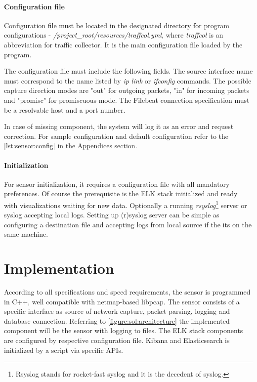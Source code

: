 \documentclass[12pt,a4paper,twoside]{report}
\begin{document}
			\subsubsection*{Configuration file} \label{implementation:sensor:config}
				Configuration file must be located in the designated directory for program configurations - \emph{/project\_root/resources/traffcol.yml}, where \emph{traffcol} is an abbreviation for traffic collector. It is the main configuration file loaded by the program.\par
				The configuration file must include the following fields. The source interface name must correspond to the name listed by \emph{ip link} or \emph{ifconfig} commands. The possible capture direction modes are "out" for outgoing packets, "in" for incoming packets and "promisc" for promiscuous mode. The Filebeat connection specification must be a resolvable host and a port number.\par
				In case of missing component, the system will log it as an error and request correction. For sample configuration and default configuration refer to the \autoref{lst:sensor:config} in the Appendices section.
			\subsubsection*{Initialization}
			For sensor initialization, it requires a configuration file with all mandatory preferences. Of course the prerequisite is the ELK stack initialized and ready with visualizations waiting for new data. Optionally a running \emph{rsyslog}\footnote{Rsyslog stands for rocket-fast syslog and it is the decedent of syslog.} server or syslog accepting local logs. Setting up (r)syslog server can be simple as configuring a destination file and accepting logs from local source if the its on the same machine.
			
\chapter{Implementation} \label{solution:implementation}
	According to all specifications and speed requirements, the sensor is programmed in C++, well compatible with netmap-based libpcap. The sensor consists of a specific interface as source of network capture, packet parsing, logging and database connection. Referring to \autoref{figure:sol:architecture} the implemented component will be the sensor with logging to files. The ELK stack components are configured by respective configuration file. Kibana and Elasticsearch is initialized by a script via specific APIs.
\end{document}
